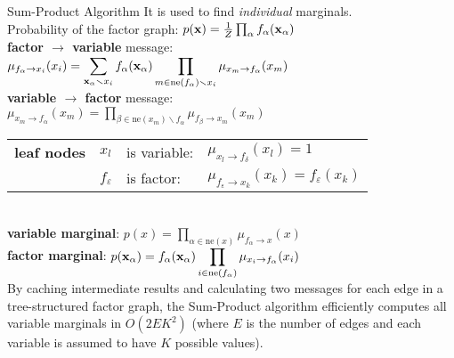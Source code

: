 \documentclass[a4paper,landscape]{amsmlaj}
\makeatletter
\renewcommand{\subsubsection}{\@startsection{subsubsection}{3}{0mm}
	{-1ex plus -.5ex minus -.2ex}
	{0.1ex plus .2ex}
	{\normalfont\footnotesize\bfseries}}
\makeatother
\begin{document}
\begin{multicols*}{3}
\subsubsection{Sum-Product Algorithm}
It is used to find \textit{individual} marginals. \\
Probability of the factor graph: $p(\bm{\mathbf{x}}) = \frac{1}{Z}\prod_\alpha f_\alpha(\bm{\mathbf{x}}_\alpha)$\\
\textbf{factor $\rightarrow$ variable} message:\\
$\displaystyle \mu_{f_\alpha\rightarrow x_i}(x_i) =
\sum_{\bm{\mathbf{x}}_\alpha \smallsetminus x_i} f_\alpha (\bm{\mathbf{x}}_\alpha)
\prod_{m \in \text{ne}(f_\alpha) \smallsetminus x_i}\mu_{x_m\rightarrow f_\alpha}(x_m)$\\
\textbf{variable $\rightarrow$ factor} message: \\
$\displaystyle \mu_{x_m\rightarrow f_\alpha}(x_m) =
\prod_{\beta \in \text{ne}(x_m)\smallsetminus f_\alpha} \mu_{f_\beta\rightarrow x_m}(x_m)$\\
\begin{tabular}{@{}llll}\\
	\textbf{leaf nodes}& $x_l$ & is variable: & $\mu_{x_l \rightarrow f_\delta}(x_l) = 1$\\
	&$f_\varepsilon$ & is factor: & $\mu_{f_\varepsilon\rightarrow x_k}(x_k) = f_\varepsilon(x_k)$
\end{tabular} \\
\textbf{variable marginal}:
$\displaystyle p(x)=\prod_{\alpha \in \text{ne}(x)} \mu_{f_\alpha \rightarrow x}(x)$ \\
\textbf{factor marginal}:
$\displaystyle p(\bm{\mathbf{x}}_\alpha) = f_\alpha(\bm{\mathbf{x}}_\alpha)
\prod_{i \in \text{ne}(f_\alpha)} \mu_{x_i \rightarrow f_\alpha}(x_i)$ \\
By caching intermediate results and calculating two messages for each edge in
a tree-structured factor graph, the Sum-Product algorithm efficiently computes
all variable marginals in $O(2EK^2)$ (where $E$ is the number of edges and each
variable is assumed to have $K$ possible values).


\end{multicols*}
\end{document}
